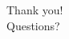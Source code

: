 \documentclass{beamer}              %
\begin{document}
\begin{frame}
\begin{center}
\huge
Thank you!
\normalsize \\
\vspace{0.3in}
Questions?
\end{center}
\end{frame}
%
%		
%		
%		
%		

\egroup
\end{document}
